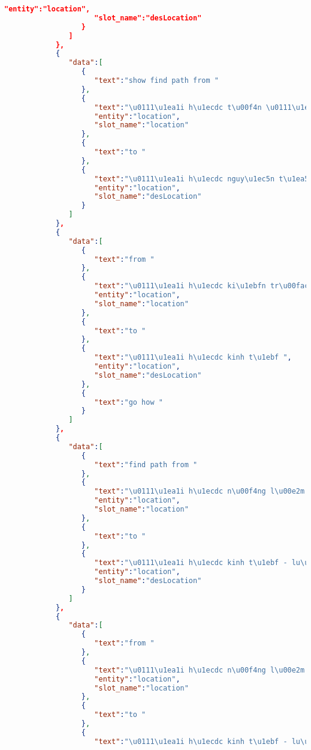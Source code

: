 \begin{lstlisting}[language=json,firstnumber=1]
                     "entity":"location",
                     "slot_name":"desLocation"
                  }
               ]
            },
            {
               "data":[
                  {
                     "text":"show find path from "
                  },
                  {
                     "text":"\u0111\u1ea1i h\u1ecdc t\u00f4n \u0111\u1ee9c th\u1eafng ",
                     "entity":"location",
                     "slot_name":"location"
                  },
                  {
                     "text":"to "
                  },
                  {
                     "text":"\u0111\u1ea1i h\u1ecdc nguy\u1ec5n t\u1ea5t th\u00e0nh ",
                     "entity":"location",
                     "slot_name":"desLocation"
                  }
               ]
            },
            {
               "data":[
                  {
                     "text":"from "
                  },
                  {
                     "text":"\u0111\u1ea1i h\u1ecdc ki\u1ebfn tr\u00fac ",
                     "entity":"location",
                     "slot_name":"location"
                  },
                  {
                     "text":"to "
                  },
                  {
                     "text":"\u0111\u1ea1i h\u1ecdc kinh t\u1ebf ",
                     "entity":"location",
                     "slot_name":"desLocation"
                  },
                  {
                     "text":"go how "
                  }
               ]
            },
            {
               "data":[
                  {
                     "text":"find path from "
                  },
                  {
                     "text":"\u0111\u1ea1i h\u1ecdc n\u00f4ng l\u00e2m ",
                     "entity":"location",
                     "slot_name":"location"
                  },
                  {
                     "text":"to "
                  },
                  {
                     "text":"\u0111\u1ea1i h\u1ecdc kinh t\u1ebf - lu\u1eadt ",
                     "entity":"location",
                     "slot_name":"desLocation"
                  }
               ]
            },
            {
               "data":[
                  {
                     "text":"from "
                  },
                  {
                     "text":"\u0111\u1ea1i h\u1ecdc n\u00f4ng l\u00e2m ",
                     "entity":"location",
                     "slot_name":"location"
                  },
                  {
                     "text":"to "
                  },
                  {
                     "text":"\u0111\u1ea1i h\u1ecdc kinh t\u1ebf - lu\u1eadt ",

\end{lstlisting}
